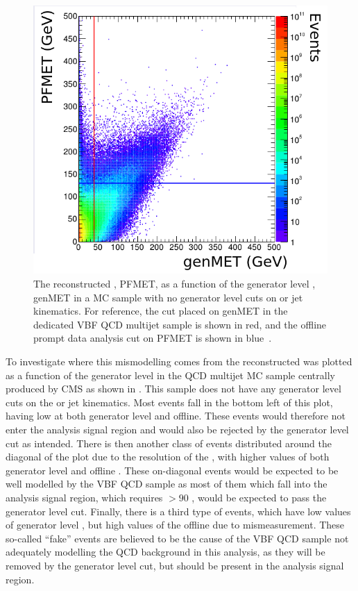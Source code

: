 \begin{figure}
  \includegraphics[width=.7\largefigwidth]{plots/parked/AN-14-243-figs/Joao_140209_p11.png}
  \caption{The reconstructed \MET, PFMET, as a function of the generator level \MET, genMET in a \ac{MC} sample with no generator level cuts on \MET or jet kinematics. For reference, the cut placed on genMET in the dedicated \ac{VBF} \ac{QCD} multijet sample is shown in red, and the offline prompt data analysis cut on PFMET is shown in blue~\cite{ARTICLE:CMSAN-14-243}.}
  \label{fig:parkedmcqcd}
\end{figure}

To investigate where this mismodelling comes from the reconstructed \MET was plotted as a function of the generator level \MET in the \ac{QCD} multijet \ac{MC} sample centrally produced by CMS as shown in . This sample does not have any generator level cuts on the \MET or jet kinematics. Most events fall in the bottom left of this plot, having low \MET at both generator level and offline. These events would therefore not enter the analysis signal region and would also be rejected by the generator level cut as intended. There is then another class of events distributed around the diagonal of the plot due to the resolution of the \MET, with higher values of both generator level and offline \MET. These on-diagonal events would be expected to be well modelled by the \ac{VBF} \ac{QCD} sample as most of them which fall into the analysis signal region, which requires \MET$>90$ \GeV, would be expected to pass the generator level cut. Finally, there is a third type of events, which have low values of generator level \MET, but high values of the offline \MET due to mismeasurement. These so-called ``fake'' \MET events are believed to be the cause of the \ac{VBF} \ac{QCD} sample not adequately modelling the \ac{QCD} background in this analysis, as they will be removed by the generator level cut, but should be present in the analysis signal region. 

